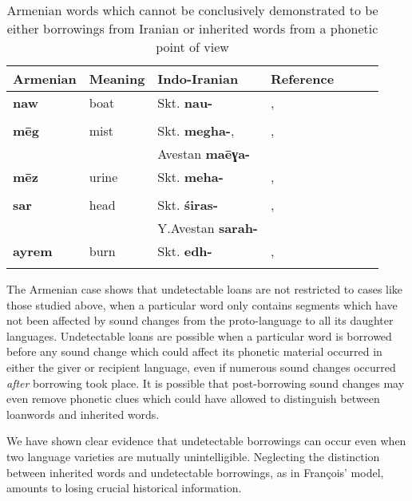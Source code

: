 \documentclass[oneside,a4paper,11pt]{article}
\newcommand{\ipa}[1]{\textbf{{\phon\mbox{#1}}}}
\begin{document}
\begin{table}[h]
\caption{Armenian words which cannot be conclusively demonstrated to be either borrowings from Iranian or inherited words from a phonetic point of view    } \centering \label{tab:armenian}
\begin{tabular}{lllllll}
\toprule 
Armenian & Meaning & Indo-Iranian & Reference \\
\midrule 
\ipa{naw}& boat & Skt. \ipa{nau-} & \citet[16-17;201]{huebschmann97armenische},\\
&&& \citet[466;715]{martirosyan10etymological} \\
\midrule 
\ipa{mēg}& mist & Skt. \ipa{megha-},  & \citet[474]{huebschmann97armenische},\\
&&Avestan \ipa{maēɣa-}& \citet[466;715]{martirosyan10etymological} \\
\midrule 
\ipa{mēz}& urine & Skt. \ipa{meha-} & \citet[474]{huebschmann97armenische},\\
&&& \citet[466;715]{martirosyan10etymological} \\
\midrule 
\ipa{sar}& head & Skt. \ipa{śiras-} & \citet[236;489]{huebschmann97armenische},\\
&&Y.Avestan \ipa{sarah-}& \citet[571]{martirosyan10etymological} \\
\midrule 
\ipa{ayrem}& burn & Skt. \ipa{edh-} & \citet[418]{huebschmann97armenische},\\
&&& \citet[145]{martzloff16geri} \\
\bottomrule
\end{tabular}
\end{table}
The Armenian case shows that undetectable loans are not restricted to cases like those studied above, when a particular word only contains segments which have not been affected by sound changes from the proto-language to all its daughter languages. Undetectable loans are possible when a particular word is borrowed before any sound change which could affect its phonetic material occurred in either the giver or recipient language, even if numerous sound changes occurred \textit{after} borrowing took place. It is possible that post-borrowing sound changes may even remove phonetic clues which could have allowed to distinguish between loanwords and inherited words.

 We have shown clear evidence that undetectable borrowings can occur even when two language varieties are mutually unintelligible. Neglecting the distinction between inherited words and undetectable borrowings, as in François' model, amounts to losing crucial historical information.
\end{document}
